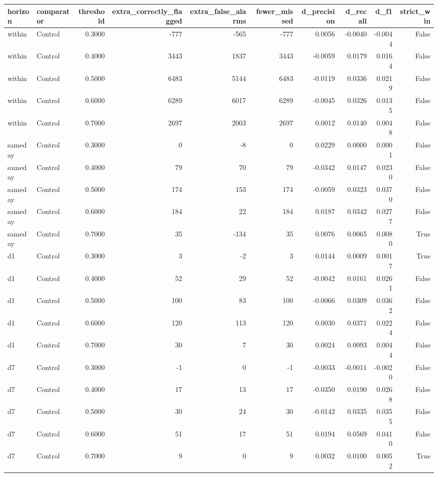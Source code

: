 \begin{tabular}{llrrrrrrrr}
\toprule
horizon & comparator & threshold & extra\_correctly\_flagged & extra\_false\_alarms & fewer\_missed & d\_precision & d\_recall & d\_f1 & strict\_win \\
\midrule
within & Control & 0.3000 & -777 & -565 & -777 & 0.0056 & -0.0040 & -0.0044 & False \\
within & Control & 0.4000 & 3443 & 1837 & 3443 & -0.0059 & 0.0179 & 0.0164 & False \\
within & Control & 0.5000 & 6483 & 5144 & 6483 & -0.0119 & 0.0336 & 0.0219 & False \\
within & Control & 0.6000 & 6289 & 6017 & 6289 & -0.0045 & 0.0326 & 0.0135 & False \\
within & Control & 0.7000 & 2697 & 2003 & 2697 & 0.0012 & 0.0140 & 0.0048 & False \\
sameday & Control & 0.3000 & 0 & -8 & 0 & 0.0229 & 0.0000 & 0.0001 & False \\
sameday & Control & 0.4000 & 79 & 70 & 79 & -0.0342 & 0.0147 & 0.0230 & False \\
sameday & Control & 0.5000 & 174 & 153 & 174 & -0.0059 & 0.0323 & 0.0370 & False \\
sameday & Control & 0.6000 & 184 & 22 & 184 & 0.0187 & 0.0342 & 0.0277 & False \\
sameday & Control & 0.7000 & 35 & -134 & 35 & 0.0076 & 0.0065 & 0.0080 & True \\
d1 & Control & 0.3000 & 3 & -2 & 3 & 0.0144 & 0.0009 & 0.0017 & True \\
d1 & Control & 0.4000 & 52 & 29 & 52 & -0.0042 & 0.0161 & 0.0261 & False \\
d1 & Control & 0.5000 & 100 & 83 & 100 & -0.0066 & 0.0309 & 0.0362 & False \\
d1 & Control & 0.6000 & 120 & 113 & 120 & 0.0030 & 0.0371 & 0.0224 & False \\
d1 & Control & 0.7000 & 30 & 7 & 30 & 0.0024 & 0.0093 & 0.0044 & False \\
d7 & Control & 0.3000 & -1 & 0 & -1 & -0.0033 & -0.0011 & -0.0020 & False \\
d7 & Control & 0.4000 & 17 & 13 & 17 & -0.0350 & 0.0190 & 0.0268 & False \\
d7 & Control & 0.5000 & 30 & 24 & 30 & -0.0142 & 0.0335 & 0.0355 & False \\
d7 & Control & 0.6000 & 51 & 17 & 51 & 0.0194 & 0.0569 & 0.0410 & False \\
d7 & Control & 0.7000 & 9 & 0 & 9 & 0.0032 & 0.0100 & 0.0052 & True \\

\end{tabular}
